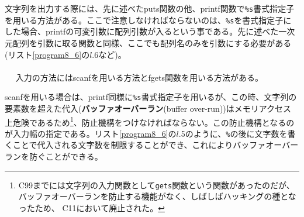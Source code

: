 文字列を出力する際には、先に述べたputs関数の他、printf関数で\verb|%s|書式指定子を用いる方法がある。ここで注意しなければならないのは、\verb|%s|を書式指定子にした場合、printfの可変引数に配列引数が入るという事である。先に述べた一次元配列を引数に取る関数と同様、ここでも配列名のみを引数にする必要がある(リスト\ref{program8_6}の$l$.6など)。
\\ \\　
入力の方法にはscanfを用いる方法とfgets関数を用いる方法がある。

scanfを用いる場合は、printf同様に\verb|%s|書式指定子を用いるが、この時、文字列の要素数を超えた代入(\textbf{バッファオーバーラン}(buffer over-run))はメモリアクセス上危険であるため\footnote{C99までには文字列の入力関数として\verb|gets|関数という関数があったのだが、バッファオーバーランを防止する機能がなく、しばしばハッキングの種となったため、 C11において廃止された。}、防止機構をつけなければならない。この防止機構となるのが入力幅の指定である。リスト\ref{program8_6}の$l$.5のように、\verb|%|の後に文字数を書くことで代入される文字数を制限することができ、これによりバッファオーバーランを防ぐことができる。

